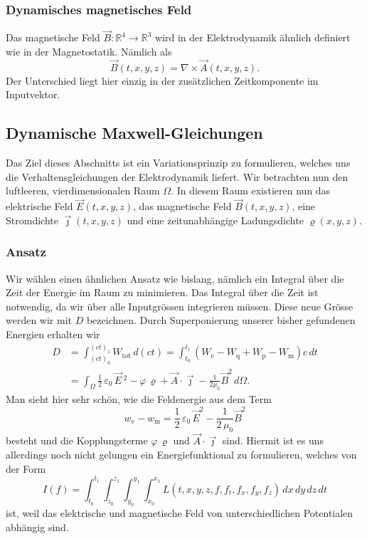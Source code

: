 \subsubsection{Dynamisches magnetisches Feld}
Das magnetische Feld
\(
\vec{B}: \mathbb{R}^4 \rightarrow \mathbb{R}^3
\)
wird in der Elektrodynamik ähnlich definiert wie in der Magnetostatik. Nämlich als
\begin{equation}
	\vec{B}(t,x,y,z)
	=
	\nabla \times \vec{A}(t,x,y,z).
	\label{maxwell:section:definition_dynamisch_magnetischesFeld}
\end{equation}
Der Unterschied liegt hier einzig in der zusätzlichen Zeitkomponente im Inputvektor.

\subsection{Dynamische Maxwell-Gleichungen}
Das Ziel dieses Abschnitts ist ein Variationsprinzip zu formulieren, welches uns die Verhaltensgleichungen der Elektrodynamik liefert. 
Wir betrachten nun den luftleeren, vierdimensionalen Raum $\Omega$.
In diesem Raum existieren nun das elektrische Feld $\vec{E}(t,x,y,z)$, das magnetische Feld $\vec{B}(t,x,y,z)$, eine Stromdichte $\vec{\jmath}(t,x,y,z)$ und eine zeitunabhängige Ladungsdichte $\varrho(x,y,z)$.

\subsubsection{Ansatz}
Wir wählen einen ähnlichen Ansatz wie bislang, nämlich ein Integral über die Zeit der Energie im Raum zu minimieren.
Das Integral über die Zeit ist notwendig, da wir über alle Inputgrössen integrieren müssen.
Diese neue Grösse werden wir mit $D$ bezeichnen.
Durch Superponierung unserer bisher gefundenen Energien erhalten wir
\begin{align*}
	D
	&=
	\int_{(ct)_0}^{(ct)_1} W_{\text{tot}}\,d(ct)
	=
	\int_{t_0}^{t_1} \left(W_{\text{e}} - W_{\text{q}} + W_{\text{p}} - W_{\text{m}}\right)c\,dt
	\\
	&= \int_{\Omega} \frac{1}{2}\,\varepsilon_0\,\vec{E}\,^2 - \varphi\,\varrho 
	+ \vec{A}\cdot\vec{\jmath} - \frac{1}{2\mu_0}\vec{B}^2 \,d\Omega.
\end{align*}
Man sieht hier sehr schön, wie die Feldenergie aus dem Term
\[
w_{\text{e}} - w_{\text{m}}
=
\frac{1}{2}\,\varepsilon_0\,\vec{E}^2 - \frac{1}{2\,\mu_0}\vec{B}^2
\]
besteht und die Kopplungsterme 
\(
\varphi\,\varrho
\)
und
\(
\vec{A}\cdot\vec{\jmath}
\)
sind.
Hiermit ist es uns allerdings noch nicht gelungen ein Energiefunktional zu formulieren, welches von der Form
\[
I(f) = \int_{t_0}^{t_1} \int_{z_0}^{z_1} \int_{y_0}^{y_1} \int_{x_0}^{x_1} L(t,x,y,z,f,f_t,f_x,f_y,f_z)\,dx\,dy\,dz\,dt 
\]
ist, weil das elektrische und magnetische Feld von unterschiedlichen Potentialen abhängig sind.

